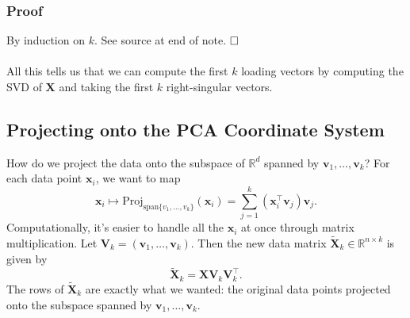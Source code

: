 \documentclass{article}
\begin{document}
\subsubsection*{Proof}
By induction on $k$. See source at end of note. $\hfill\square$
\\ \\
All this tells us that we can compute the first $k$ loading vectors by computing the SVD of $\textbf{X}$ and taking the first $k$ right-singular vectors. 

\subsection*{Projecting onto the PCA Coordinate System}
How do we project the data onto the subspace of $\mathbb{R}^d$ spanned by $\textbf{v}_1, \hdots, \textbf{v}_k$? For each data point $\textbf{x}_i$, we want to map 
\[
\textbf{x}_i \mapsto \text{Proj}_{\text{span}\{v_1,\hdots,v_k\}}(\textbf{x}_i) = \sum_{j=1}^k (\textbf{x}_i^\top \textbf{v}_j)\textbf{v}_j.
\]
Computationally, it's easier to handle all the $\textbf{x}_i$ at once through matrix multiplication. Let $\textbf{V}_k = (\textbf{v}_1, \hdots, \textbf{v}_k)$. Then the new data matrix $\widetilde{\textbf{X}}_k \in \mathbb{R}^{n \times k}$ is given by
\[
\widetilde{\textbf{X}}_k = \textbf{X}\textbf{V}_k\textbf{V}_k^\top.
\]
The rows of $\widetilde{\textbf{X}}_k$ are exactly what we wanted: the original data points projected onto the subspace spanned by $\textbf{v}_1, \hdots, \textbf{v}_k$.
\end{document}
